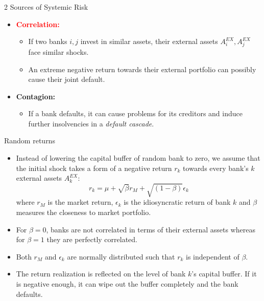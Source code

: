 \documentclass{beamer}
\begin{document}
\begin{frame}{2 Sources of Systemic Risk}
	\begin{itemize}
		\item \textcolor{red}{\textbf{Correlation:}}
		\begin{itemize}
			\item If two banks $i,j$ invest in similar assets, their external assets $A^{EX}_i,A^{EX}_j$ face similar shocks.
			\item An extreme negative return towards their external portfolio can possibly cause their joint default.
		\end{itemize}
		\item \textbf{Contagion:}
		\begin{itemize}
			\item If a bank defaults, it can cause problems for its creditors and induce further insolvencies in a \textit{default cascade}.
		\end{itemize}
	\end{itemize}
\end{frame}

\begin{frame}{Random returns}
\begin{itemize}
	\item Instead of lowering the capital buffer of random bank to zero, we assume that the initial shock takes a form of a negative return $r_k$ towards every bank's $k$ external assets $A^{EX}_k$:
	\begin{equation}
		r_k = \mu + \sqrt{\beta} r_M + \sqrt{(1-\beta)} \epsilon_k \nonumber
	\end{equation}
	where $r_M$ is the market return, $\epsilon_k$ is the idiosyncratic return of bank $k$ and $\beta$ measures the closeness to market portfolio.
	\item For $\beta=0$, banks are not correlated in terms of their external assets whereas for $\beta=1$ they are perfectly correlated.
	\item Both $r_M$ and $\epsilon_k$ are normally distributed such that $r_k$ is independent of $\beta$.
	\item The return realization is reflected on the level of bank $k$'s capital buffer. If it is negative enough, it can wipe out the buffer completely and the bank defaults.
\end{itemize}
\end{frame}
\end{document}
